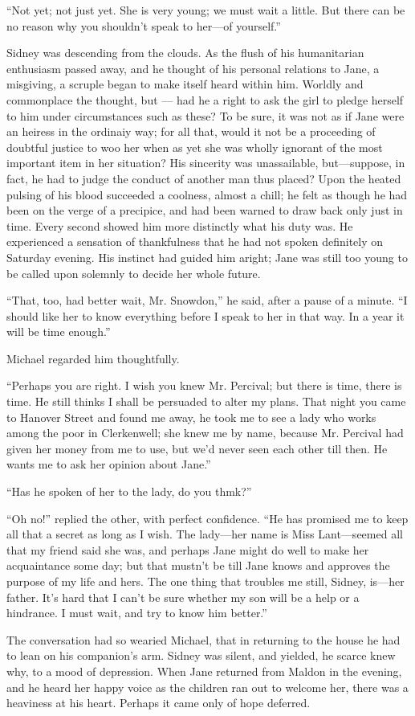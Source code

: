 {}``Not yet; not just yet. She is very young; we must wait a little. But
there can be no reason why you shouldn't speak to her---of yourself.''

Sidney was descending from the clouds. As the flush of his humanitarian
enthusiasm passed away, and he thought of his personal relations to
Jane, a misgiving, a scruple began to make itself heard within him.
Worldly and commonplace the thought, but --- had he a right to ask the
girl to pledge herself to him under circumstances such as these? To be
sure, it was not as if Jane were an heiress in the ordinaiy way; for all
that, would it not be a proceeding of doubtful justice to woo her when
as yet she was wholly ignorant of the most important item in her
situation? His sincerity was unassailable, but---suppose, in fact, he
had to judge the conduct of another man thus placed? Upon the heated
pulsing of his blood succeeded a coolness, almost a chill; he felt as
though he had been on the verge of a precipice, and had been warned to
draw back {}only just in time. Every second showed him more distinctly
what his duty was. He experienced a sensation of thankfulness that he
had not spoken definitely on Saturday evening. His instinct had guided
him aright; Jane was still too young to be called upon solemnly to
decide her whole future.

``That, too, had better wait, Mr. Snowdon,'' he said, after a pause of a
minute. ``I should like her to know everything before I speak to her in
that way. In a year it will be time enough.''

Michael regarded him thoughtfully.

``Perhaps you are right. I wish you knew Mr. Percival; but there is
time, there is time. He still thinks I shall be persuaded to alter my
plans. That night you came to Hanover Street and found me away, he took
me to see a lady who works among the poor in Clerkenwell; she knew me by
name, because Mr. Percival had given her money from me to use, but we'd
never seen each other till then. He wants me to ask her opinion about
Jane.''

{}``Has he spoken of her to the lady, do you thmk?''

``Oh no!'' replied the other, with perfect confidence. ``He has promised
me to keep all that a secret as long as I wish. The lady---her name is
Miss Lant---seemed all that my friend said she was, and perhaps Jane
might do well to make her acquaintance some day; but that mustn't be
till Jane knows and approves the purpose of my life and hers. The one
thing that troubles me still, Sidney, is---her father. It's hard that I
can't be sure whether my son will be a help or a hindrance. I must wait,
and try to know him better.''

The conversation had so wearied Michael, that in returning to the house
he had to lean on his companion's arm. Sidney was silent, and yielded,
he scarce knew why, to a mood of depression. When Jane returned from
Maldon in the evening, and he heard her happy voice as the children ran
out to welcome her, there was a heaviness at his heart. Perhaps it came
only of hope deferred.
